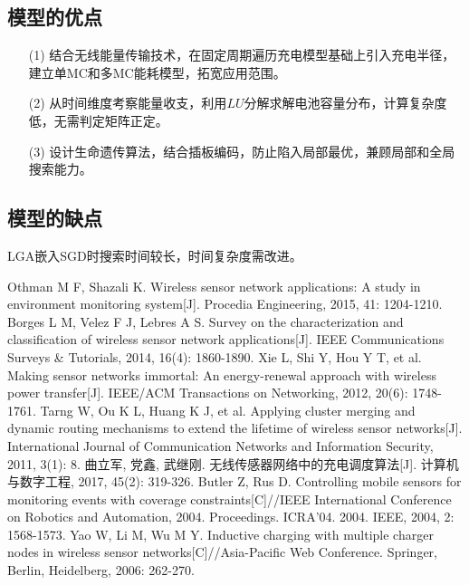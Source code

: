 \documentclass{whutmod}
\begin{document}
        \subsection{模型的优点}
            \begin{itemize}
                \item[(1)] 结合无线能量传输技术，在固定周期遍历充电模型基础上引入充电半径，建立单MC和多MC能耗模型，拓宽应用范围。
                \item[(2)] 从时间维度考察能量收支，利用$LU$分解求解电池容量分布，计算复杂度低，无需判定矩阵正定。
                \item[(3)] 设计生命遗传算法，结合插板编码，防止陷入局部最优，兼顾局部和全局搜索能力。
            \end{itemize}

        \subsection{模型的缺点}
            LGA嵌入SGD时搜索时间较长，时间复杂度需改进。

    \newpage
    \nocite{*}
    \begin{thebibliography}{9}
         Othman M F, Shazali K. Wireless sensor network applications: A study in environment monitoring system[J]. Procedia Engineering, 2015, 41: 1204-1210.
         Borges L M, Velez F J, Lebres A S. Survey on the characterization and classification of wireless sensor network applications[J]. IEEE Communications Surveys \& Tutorials, 2014, 16(4): 1860-1890.
         Xie L, Shi Y, Hou Y T, et al. Making sensor networks immortal: An energy-renewal approach with wireless power transfer[J]. IEEE/ACM Transactions on Networking, 2012, 20(6): 1748-1761.
         Tarng W, Ou K L, Huang K J, et al. Applying cluster merging and dynamic routing mechanisms to extend the lifetime of wireless sensor networks[J]. International Journal of Communication Networks and Information Security, 2011, 3(1): 8.
         曲立军, 党鑫, 武继刚. 无线传感器网络中的充电调度算法[J]. 计算机与数字工程, 2017, 45(2): 319-326.
         Butler Z, Rus D. Controlling mobile sensors for monitoring events with coverage constraints[C]//IEEE International Conference on Robotics and Automation, 2004. Proceedings. ICRA'04. 2004. IEEE, 2004, 2: 1568-1573.
         Yao W, Li M, Wu M Y. Inductive charging with multiple charger nodes in wireless sensor networks[C]//Asia-Pacific Web Conference. Springer, Berlin, Heidelberg, 2006: 262-270.
    \end{thebibliography}
\end{document}
